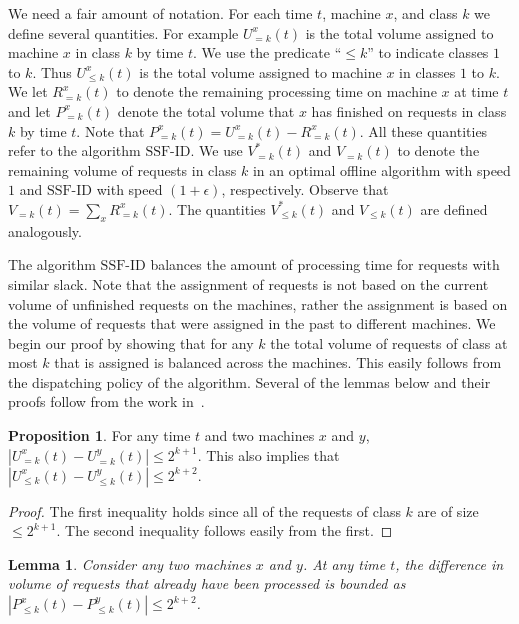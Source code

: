 \documentclass[10pt]{article}
\newtheorem{lemma}[theorem]{Lemma}
\theoremstyle{definition}
\newtheorem{proposition}[theorem]{Proposition}
\numberwithin{equation}{section}
\newcommand{\eps}{\epsilon}
\newcommand{\Algorithm}[1]{{\textrm{#1}}} %
\newcommand{\mmug}{\Algorithm{SSF-ID}} %
\begin{document}
We need a fair amount of notation. For each time $t$, machine $x$, and
class $k$ we define several quantities. For example $U^x_{=k}(t)$ is
the total volume assigned to machine $x$ in class $k$ by time $t$. We
use the predicate ``$\le k$'' to indicate classes $1$ to $k$.  Thus $U^x_{\le
  k}(t)$ is the total volume assigned to machine $x$ in classes $1$ to
$k$. We let $R^x_{=k}(t)$ to denote the remaining processing time on
machine $x$ at time $t$ and let $P^x_{=k}(t)$ denote the total volume
that $x$ has finished on requests in class $k$ by time $t$. Note that
$P^x_{=k}(t) = U^x_{=k}(t) - R^x_{=k}(t)$. All these quantities refer
to the algorithm $\mmug$. We use $V^*_{=k}(t)$ and $V_{=k}(t)$ to
denote the remaining volume of requests in class $k$ in an optimal
offline algorithm with speed $1$ and $\mmug$ with speed $(1+\eps)$,
respectively. Observe that $V_{=k}(t) = \sum_x R^x_{=k}(t)$.  The
quantities $V^*_{\le k}(t)$ and $V_{\le k}(t)$ are defined
analogously.

The algorithm $\mmug$ balances the amount of processing time for
requests with similar slack.  Note that the assignment of requests is
not based on the current volume of unfinished requests on the
machines, rather the assignment is based on the volume of requests
that were assigned in the past to different machines.  We begin our
proof by showing that for any $k$ the total volume of requests of
class at most $k$ that is assigned is balanced across the machines.
This easily follows from the dispatching policy of the
algorithm. Several of the lemmas below and their proofs
follow from the work in~\cite{AvrahamiA03,ChekuriGKK04}.

\begin{proposition}
\label{observation} 
For any time $t$ and two machines $x$ and $y$,
$|U^{x}_{=k}(t) - U^{y}_{=k}(t)| \leq 2^{k+1}$.  This also implies
that $|U^{x}_{\leq k}(t) - U^{y}_{\leq k}(t)| \leq 2^{k+2}$.
\end{proposition}
\begin{proof}
  The first inequality holds since all of the requests of class $k$
  are of size $\leq 2^{k+1}$.  The second inequality follows easily
  from the first.
\end{proof}




\begin{lemma}
  \label{lem:processbound} Consider any two machines $x$ and $y$.  At any time $t$, the
  difference in volume of requests that already have been
  processed is bounded as $|P^{x}_{\leq k} (t) - P^{y}_{\leq k} (t)|
  \leq 2^{k+2}$.
\end{lemma}
\end{document}
